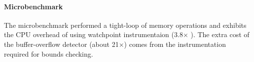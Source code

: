 \documentclass[letterpaper,twocolumn,10pt]{article}
\let\ORIGcaption\caption
\renewcommand{\caption}[2][\compressedcaption]{%
\def\compressedcaption{#2}%
    \vspace{-12pt}%
    \ORIGcaption[#1]{#2}%
    \vspace{-12pt}}
\begin{document}



\paragraph{Microbenchmark} %
The microbenchmark performed a tight-loop of memory operations and exhibits the CPU overhead of using watchpoint instrumentaion (3.8{\footnotesize$\times$} ). The extra cost of the buffer-overflow detector (about 21{\footnotesize$\times$}) comes from the instrumentation required for bounds checking.





\end{document}
